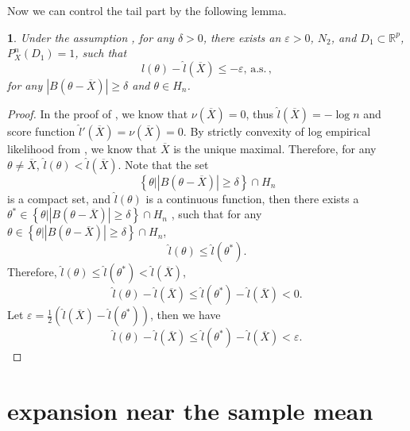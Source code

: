 \documentclass[oneside,english]{amsbook}
\numberwithin{section}{chapter}
\numberwithin{equation}{section}
\numberwithin{figure}{section}
\theoremstyle{plain}
\newtheorem{lem}{\protect\lemmaname}
\theoremstyle{plain}
\theoremstyle{definition}
\theoremstyle{plain}
\theoremstyle{plain}
\theoremstyle{remark}
\theoremstyle{definition}
\theoremstyle{definition}
\newcommand{\ascv}{\,\mathrm{a.s.}\,}
\providecommand{\lemmaname}{Lemma}
\begin{document}
Now we can control the tail part by the following lemma.
\begin{lem}
\label{lem:exponential-decay-tail}Under the assumption ,
for any $\delta>0$, there exists an $\varepsilon>0$, $N_{2}$, and
$D_{1}\subset\mathbb{R}^{p}$, $P_{X}^{n}\left(D_{1}\right)=1$, such
that 
\[
\hat{l}\left(\theta\right)-\hat{l}\left(\overline{X}\right)\le-\varepsilon,\ascv,
\]
for any $\left|B\left(\theta-\overline{X}\right)\right|\ge\delta$
and $\theta\in H_{n}$. \end{lem}
\begin{proof}
In the proof of , we know that $\nu\left(\overline{X}\right)=0$,
thus $\hat{l}\left(\overline{X}\right)=-\log n$ and score function
$\hat{l}'\left(\overline{X}\right)=\nu\left(\overline{X}\right)=0$.
By strictly convexity of log empirical likelihood from ,
we know that $\overline{X}$ is the unique maximal. Therefore, for
any $\theta\neq\overline{X}$, $\hat{l}\left(\theta\right)<\hat{l}\left(\overline{X}\right)$.
Note that the set 
\[
\left\{ \theta|\left|B\left(\theta-\overline{X}\right)\right|\ge\delta\right\} \cap H_{n}
\]
is a compact set, and $\hat{l}\left(\theta\right)$ is a continuous
function, then there exists a $\theta^{*}\in\left\{ \theta|\left|B\left(\theta-\overline{X}\right)\right|\ge\delta\right\} \cap H_{n}$
, such that for any $\theta\in\left\{ \theta|\left|B\left(\theta-\overline{X}\right)\right|\ge\delta\right\} \cap H_{n}$,
\[
\hat{l}\left(\theta\right)\le\hat{l}\left(\theta^{*}\right).
\]
Therefore, $\hat{l}\left(\theta\right)\le\hat{l}\left(\theta^{*}\right)<\hat{l}\left(\overline{X}\right)$,
\[
\hat{l}\left(\theta\right)-\hat{l}\left(\overline{X}\right)\le\hat{l}\left(\theta^{*}\right)-\hat{l}\left(\overline{X}\right)<0.
\]
Let $\varepsilon=\frac{1}{2}\left(\hat{l}\left(\overline{X}\right)-\hat{l}\left(\theta^{*}\right)\right)$,
then we have 
\[
\hat{l}\left(\theta\right)-\hat{l}\left(\overline{X}\right)\le\hat{l}\left(\theta^{*}\right)-\hat{l}\left(\overline{X}\right)<\varepsilon.
\]

\end{proof}

\section{expansion near the sample mean}
\end{document}
